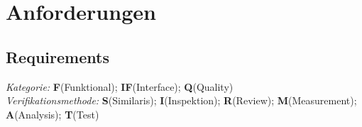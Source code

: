 \chapter{Anforderungen}
\label{cha:Anforderungen}


\section{Requirements}
\textit{Kategorie:} \textbf{F}(Funktional); \textbf{IF}(Interface);
 \textbf{Q}(Quality)\\
\textit{Verifikationsmethode:} \textbf{S}(Similaris); \textbf{I}(Inspektion); 
\textbf{R}(Review); \textbf{M}(Measurement);
\textbf{A}(Analysis); \textbf{T}(Test)


